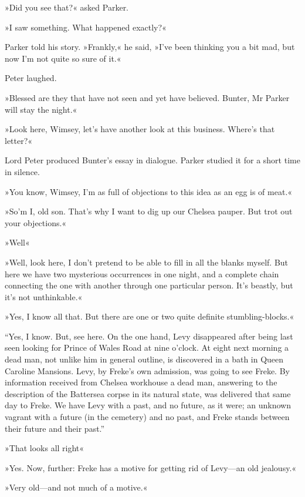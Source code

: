 »Did you see that?« asked Parker.

»I saw something. What happened exactly?«

Parker told his story. »Frankly,« he said, »I've been thinking you a bit mad, but now I'm not quite so sure of it.«

Peter laughed.

»Blessed are they that have not seen and yet have believed. Bunter, Mr Parker will stay the night.«

»Look here, Wimsey, let's have another look at this business. Where's that letter?«

Lord Peter produced Bunter's essay in dialogue. Parker studied it for a short time in silence.

»You know, Wimsey, I'm as full of objections to this idea as an egg is of meat.«

»So'm I, old son. That's why I want to dig up our Chelsea pauper. But trot out your objections.«

»Well\longdash«

»Well, look here, I don't pretend to be able to fill in all the blanks myself. But here we have two mysterious occurrences in one night, and a complete chain connecting the one with another through one particular person. It's beastly, but it's not unthinkable.«

»Yes, I know all that. But there are one or two quite definite stumbling-blocks.«

“Yes, I know. But, see here. On the one hand, Levy disappeared after being last seen looking for Prince of Wales Road at nine o'clock. At eight next morning a dead man, not unlike him in general outline, is discovered in a bath in Queen Caroline Mansions. Levy, by Freke's own admission, was going to see Freke. By information received from Chelsea workhouse a dead man, answering to the description of the Battersea corpse in its natural state, was delivered that same day to Freke. We have Levy with a past, and no future, as it were; an unknown vagrant with a future (in the cemetery) and no past, and Freke stands between their future and their past.”

»That looks all right\longdash«

»Yes. Now, further: Freke has a motive for getting rid of Levy\allowbreak---\allowbreak an old jealousy.«

»Very old\allowbreak---\allowbreak and not much of a motive.«

